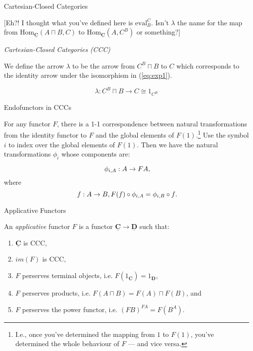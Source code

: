 \documentclass[10pt]{beamer}
\newcommand{\Cat}[1]{\ensuremath{\underline{\mathbf{#1}}}}
\newcommand{\Hom}[3]{\ensuremath{\mathrm{Hom}_{\Cat{#1}}(#2,#3)}}
\newcommand{\Com}[3]{#3^{#2}}
\newcommand{\eqnlabel}[1]{\label{eq:#1}}
\newcommand{\eqnref}[1]{(\ref{eq:#1})}
\theoremstyle{definition}
\theoremstyle{remark}
\numberwithin{equation}{section}
\begin{document}
\begin{frame}[fragile]{Cartesian-Closed Categories}

  [Eh?! I thought what you've defined here is $\mathrm{eval}_B^C$. Isn't $\lambda$
the name for the map from $\Hom{C}{A\sqcap B}{C}$ to $\Hom{C}{A}{\Com{C}{B}{C}}
\eqnlabel{exp1}$ or something?]
  
  \emph{Cartesian-Closed Categories (CCC)}

  We define the arrow $\lambda$ to be the arrow from $\Com{C}{B}{C}\sqcap B$ to $C$ which corresponds to the identity arrow under the isomorphism in \eqnref{exp1}.

  \[
  \lambda : \Com{C}{B}{C}\sqcap B \rightarrow C \cong 1_{\Com{C}{B}{C}}
  \]

\end{frame}

\begin{frame}[fragile]{Endofunctors in CCCs}

  For any functor $F$, there is a 1-1 correspondence between natural
  transformations from the identity functor to $F$ and the global elements of
  $F(1)$.\footnote{I.e., once you've determined the mapping from $1$ to $F(1)$,
    you've determined the whole behaviour of $F$ --- and vice versa.} Use the
  symbol $i$ to index over the global elements of $F(1)$. Then we have the
  natural transformations $\phi_i$ whose components are:
  
  \[
  \phi_{i,A} : A \rightarrow F A\rlap{,}
  \]
  where
  \[
  f : A \rightarrow B, F(f) \circ \phi_{i,A} = \phi_{i,B} \circ f\rlap{.}
  \]

\end{frame}

\begin{frame}[fragile]{Applicative Functors}

  An \emph{applicative} functor $F$ is a functor $\Cat{C}\rightarrow \Cat{D}$ such that:
  \begin{enumerate}
    \item $\Cat{C}$ is CCC,
    \item $im(F)$ is CCC,
    \item $F$ perserves terminal objects, i.e. $F(1_{\Cat{C}})=1_{\Cat{D}}$,
    \item $F$ perserves products, i.e. $F(A\sqcap B)=F(A)\sqcap F(B)$, and
    \item $F$ perserves the power functor, i.e. $\Com{D}{F A}{(F B)} = F (\Com{C}{A}{B})$.
  \end{enumerate}

\end{frame}
\end{document}
